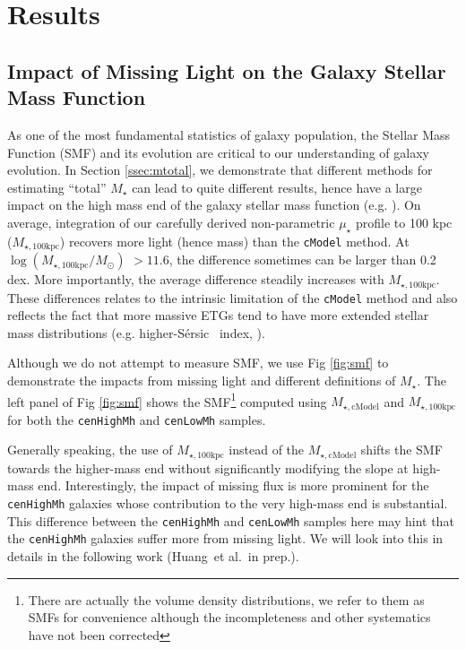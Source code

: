 \documentclass[a4paper,fleqn,usenatbib]{mnras}
\def\etal{{\ et al.~}}
\def\ser{{S\'{e}rsic\ }}
\def\rbcg{\texttt{cenHighMh}}
\def\nbcg{\texttt{cenLowMh}}
\def\mstar{{$M_{\star}$}}
\def\mtot{{$M_{\star,100\mathrm{kpc}}$}}
\def\mcmodel{{$M_{\star,\mathrm{cModel}}$}}
\def\logmtot{{$\log (M_{\star,100\mathrm{kpc}}/M_{\odot})$}}
\def\mden{{$\mu_{\star}$}}
\begin{document}
\section{Results}
    \label{sec:result}

\subsection{Impact of Missing Light on the Galaxy Stellar Mass Function}
    \label{ssec:smf}
    
    As one of the most fundamental statistics of galaxy population, the Stellar 
    Mass Function (SMF) and its evolution are critical to our understanding of 
    galaxy evolution.  
    In Section \ref{ssec:mtotal}, we demonstrate that different methods for estimating
    ``total'' \mstar{} can lead to quite different results, hence have a large impact 
    on the high mass end of the galaxy stellar mass function (e.g. 
    \citealt{Bernardi2013, DSouza2014, DSouza2015, Bernardi2017}).
    On average, integration of our carefully derived non-parametric \mden{} profile 
    to 100 kpc (\mtot{}) recovers more light (hence mass) than the \texttt{cModel}
    method. 
    At \logmtot{} $>11.6$, the difference sometimes can be larger than 0.2 dex. 
    More importantly, the average difference steadily increases with \mtot{}. 
    These differences relates to the intrinsic limitation of the \texttt{cModel} 
    method and also reflects the fact that more massive ETGs tend to have more 
    extended stellar mass distributions (e.g. higher-\ser{} index, 
    \citealt{Graham2003}).
    
    Although we do not attempt to measure SMF, we use Fig \ref{fig:smf}
    to demonstrate the impacts from missing light and different definitions of 
    \mstar{}.
    The left panel of Fig \ref{fig:smf} shows the SMF\footnote{There are actually
    the volume density distributions, we refer to them as SMFs for convenience 
    although the incompleteness and other systematics have not been corrected}
    computed using \mcmodel{} and \mtot{} for both the \rbcg{} and \nbcg{} samples.
    
    Generally speaking, the use of \mtot{} instead of the \mcmodel{} shifts the SMF 
    towards the higher-mass end without significantly modifying the slope at 
    high-mass end.
    Interestingly, the impact of missing flux is more prominent for the \rbcg{} 
    galaxies whose contribution to the very high-mass end is substantial. 
    This difference between the \rbcg{} and \nbcg{} samples here may hint that 
    the \rbcg{} galaxies suffer more from missing light. 
    We will look into this in details in the following work (Huang\etal in prep.).
\end{document}
